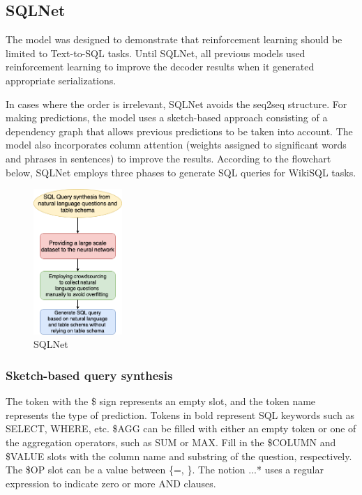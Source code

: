 \subsection{SQLNet} \label{sec:sqlnet}

The model was designed to demonstrate that reinforcement learning should be limited to Text-to-SQL tasks.
Until SQLNet\cite{xu_sqlnet_2017}, all previous models used reinforcement learning to improve the decoder results when it generated appropriate serializations.


In cases where the order is irrelevant, SQLNet avoids the seq2seq structure.
For making predictions, the model uses a sketch-based approach consisting of a dependency graph that allows previous predictions to be taken into account.
The model also incorporates column attention (weights assigned to significant words and phrases in sentences) to improve the results. According to the flowchart below, SQLNet employs three phases to generate SQL queries for WikiSQL tasks.

\begin{figure}[htb]
    \centering
    \includegraphics[width=0.3\textwidth]{pics/sqlnet/sqlnet.png}
    \caption{SQLNet\cite{xu_sqlnet_2017}}
    \label{fig:sqlnet}
\end{figure}

\subsubsection{Sketch-based query synthesis}

The token with the \$ sign represents an empty slot, and the token name represents the type of prediction. Tokens in bold represent SQL keywords such as SELECT, WHERE, etc.
\$AGG can be filled with either an empty token or one of the aggregation operators, such as SUM or MAX. Fill in the \$COLUMN and \$VALUE slots with the column name and substring of the question, respectively. The \$OP slot can be a value between \{=, \}. The notion \(...\)* uses a regular expression to indicate zero or more AND clauses.

